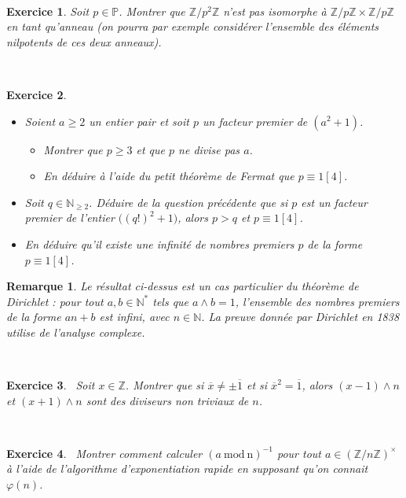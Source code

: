 \documentclass[11pt,a4paper]{article}
\newtheorem{ex}{Exercice}
\newtheorem*{rem}{Remarque}
\newcommand{\N}{\mathbb{N}}
\newcommand{\Z}{\mathbb{Z}}
\begin{document}
\





\begin{ex}\label{non_isomorphisme}
Soit $p\in \mathbb{P}$. Montrer que $\Z/p^2\Z$ n'est pas isomorphe à $\Z/p\Z\times \Z/p\Z$ en tant qu'anneau (on pourra par exemple considérer l'ensemble des éléments nilpotents de ces deux anneaux). 
\end{ex}

\

\begin{ex}\label{exemple_Dirichlet} \
\begin{itemize}
\item[$1.$] Soient $ a \geqslant 2 $ un entier pair  et soit $p$ un facteur premier de $(a^2+1)$.
\begin{itemize}
\item[$a)$] Montrer que $p \geqslant 3$ et que $p$ ne divise pas $a$.
\item[$b)$] En déduire à l'aide du petit théorème de Fermat que ${p}\equiv {1}[{4}] $.
\end{itemize} 
\item[$2.$] Soit $q\in \N_{\geq 2}$. Déduire de la question précédente que si $p$ est un facteur premier de l'entier $\big( (q!)^2+1  \big) $, alors $p>q$ et $p \equiv 1 [4]$.
\item[$3.$] En déduire qu'il existe une infinité de nombres premiers $p$ de la forme $p \equiv 1 [4]$.
\end{itemize}
\end{ex}

\begin{rem}
Le résultat ci-dessus est un cas particulier du théorème de Dirichlet : pour tout $a,b\in \N^*$ tels que $a\wedge b=1$, l'ensemble des nombres premiers de la forme $an+b$ est infini, avec $n\in \N$. La preuve donnée par Dirichlet en 1838 utilise de l'analyse complexe.
\end{rem}

\

\begin{ex}\
Soit $x\in \Z$. Montrer que si $\overline{x}\neq \pm\overline{1}$ et si $\overline{x}^2=\overline{1}$, alors $(x-1)\wedge n$ et $(x+1)\wedge n$ sont des diviseurs non triviaux de $n$.
\end{ex}




\



\begin{ex}\
Montrer comment calculer $(a\mathrm{\ mod\ n})^{-1}$ pour tout $ a \in ( \mathbb{Z}/n \mathbb{Z})^{\times}$ à l'aide de l'algorithme d'exponentiation rapide en supposant qu'on connait $\varphi(n)$.
\end{ex}
\end{document}
